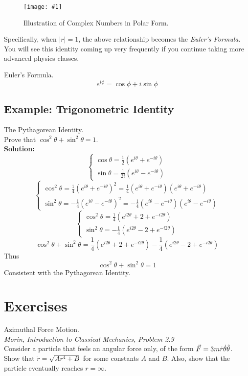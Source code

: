 \documentclass[11pt]{article}
\newcommand{\fig}[4]{
    \begin{figure}[H]
        \centering
        \texttt{[image: \#1]}
        \caption{#2}
        \label{exp4fit}
    \end{figure}
}
\theoremstyle{gangnamstyle}{\newtheorem{definition}{Definition}[]}
\theoremstyle{gangnamstyle}{\newtheorem{example}{Example}[]}
\theoremstyle{gangnamstyle}{\newtheorem{problem}{Problem}[]}
\begin{document}
\fig{figs/n0/complex.jpeg}{Illustration of Complex Numbers in Polar Form.}{0.1}{0}

Specifically, when $|r| = 1$, the above relationship becomes the \textit{Euler's Formula}. You will see this identity coming up very frequently if you continue taking more advanced physics classes. 
\begin{definition}
Euler's Formula. \\
\begin{equation}
e^{i\phi} = \cos\phi + i\sin\phi
\end{equation}
\end{definition}

\subsection{Example: Trigonometric Identity}
\begin{example}
The Pythagorean Identity. \\
Prove that $\cos^2\theta + \sin^2\theta = 1$. \\

\textbf{Solution:} 
\[ \begin{cases}
\cos\theta = \frac{1}{2}(e^{i\theta} + e^{-i\theta}) \\
\sin\theta = \frac{1}{2i}(e^{i\theta} - e^{-i\theta})
\end{cases} \]
\[ \begin{cases}
\cos^2\theta = \frac{1}{4}(e^{i\theta} + e^{-i\theta})^2 = \frac{1}{4}(e^{i\theta} + e^{-i\theta})(e^{i\theta} + e^{-i\theta}) \\
\sin^2\theta = -\frac{1}{4}(e^{i\theta} - e^{-i\theta})^2 = -\frac{1}{4}(e^{i\theta} - e^{-i\theta})(e^{i\theta} - e^{-i\theta})
\end{cases} \]
\[ \begin{cases}
\cos^2\theta = \frac{1}{4}(e^{i2\theta} + 2 + e^{-i2\theta}) \\
\sin^2\theta = -\frac{1}{4}(e^{i2\theta} - 2 + e^{-i2\theta})
\end{cases} \]
\[ \cos^2\theta + \sin^2\theta = \frac{1}{4}(e^{i2\theta} + 2 + e^{-i2\theta}) -\frac{1}{4}(e^{i2\theta} - 2 + e^{-i2\theta}) \]
Thus
\[ \cos^2\theta + \sin^2\theta = 1 \]
Consistent with the Pythagorean Identity.
\end{example}

\pagebreak

\section{Exercises}
\begin{problem}
Azimuthal Force Motion. \\
\textit{Morin, Introduction to Classical Mechanics, Problem 2.9} \\
Consider a particle that feels an angular force only, of the form $\Vec{F} = 3m\Dot{r}\Dot{\theta}\Hat{\theta}$. Show that $\Dot{r} = \sqrt{Ar^4 + B}$ for some constants $A$ and $B$. Also, show that the particle eventually reaches $r = \infty$. 
\end{problem}
\end{document}
